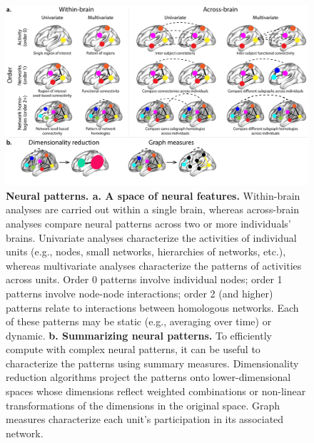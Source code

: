 \documentclass[english]{article}
\begin{document}
\begin{figure}[tp]
  \centering
  \includegraphics[width=\textwidth]{figs/patterns}
  \caption{\textbf{Neural patterns.  a. A space of neural features.}
    Within-brain analyses are carried out within a single brain,
    whereas across-brain analyses compare neural patterns across two
    or more individuals' brains.  Univariate analyses characterize the
    activities of individual units (e.g., nodes, small networks,
    hierarchies of networks, etc.), whereas multivariate analyses
    characterize the patterns of activities across units.  Order 0
    patterns involve individual nodes; order 1 patterns involve
    node-node interactions; order 2 (and higher) patterns relate to
    interactions between homologous networks.  Each of these patterns
    may be static (e.g., averaging over time) or dynamic.
    \textbf{b. Summarizing neural patterns.}  To efficiently compute
    with complex neural patterns, it can be useful to characterize the
    patterns using summary measures.  Dimensionality reduction
    algorithms project the patterns onto lower-dimensional spaces
    whose dimensions reflect weighted combinations or non-linear
    transformations of the dimensions in the original space.  Graph
    measures characterize each unit's participation in its associated
    network.}
  \label{fig:patterns}
\end{figure}
\end{document}
